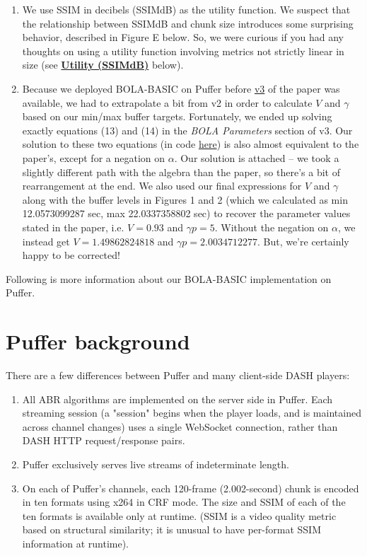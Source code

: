 \documentclass[12pt]{article}
\begin{document}
\begin{enumerate}
    \item 
We use SSIM in decibels (SSIMdB) as the utility function. We suspect that the relationship between SSIMdB and chunk size introduces some surprising behavior, described in Figure E below. So, we were curious if you had any thoughts on using a utility function involving metrics not strictly linear in size (see \hyperref[sec:Utility]{\textbf{Utility (SSIMdB)}} below).
\item
Because we deployed BOLA-BASIC on Puffer before \href {https://arxiv.org/pdf/1601.06748.pdf}{v3} of the paper was available, we had to extrapolate a bit from v2 in order to calculate $V$ and $\gamma$ based on our min/max buffer targets. Fortunately, we ended up solving exactly equations (13) and (14) in the \textit{BOLA Parameters} section of v3. Our solution to these two equations (in code \href{https://github.com/StanfordSNR/puffer/blob/master/src/abr/bola_basic.hh}{here}) is also almost equivalent to the paper's, except for a negation on $\alpha$. Our solution is attached -- we took a slightly different path with the algebra than the paper, so there's a bit of rearrangement at the end. We also used our final expressions for $V$ and $\gamma$ along with the buffer levels in Figures 1 and 2 (which we calculated as min 12.0573099287 sec, max 22.0337358802 sec) to recover the parameter values stated in the paper, i.e. $V = 0.93$ and $\gamma p = 5$. Without the negation on $\alpha$, we instead get $V = 1.49862824818$ and $\gamma p = 2.0034712277$. But, we're certainly happy to be corrected!	 	
\end{enumerate} 

Following is more information about our BOLA-BASIC implementation on Puffer. 
 
\section*{Puffer background} 
There are a few differences between Puffer and many client-side DASH players: 
\begin{enumerate}
    \item 
All ABR algorithms are implemented on the server side in Puffer. Each streaming session (a "session" begins when the player loads, and is maintained across channel changes) uses a single WebSocket connection, rather than DASH HTTP request/response pairs. 
\item
Puffer exclusively serves live streams of indeterminate length. 
\item
On each of Puffer's channels, each 120-frame (2.002-second) chunk is encoded in ten formats using x264 in CRF mode. The size and SSIM of each of the ten formats is available only at runtime. (SSIM is a video quality metric based on structural similarity; it is unusual to have per-format SSIM information at runtime).

\end{enumerate} 
\newpage
\end{document}
